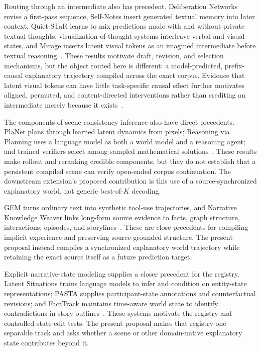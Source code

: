 \documentclass[11pt]{article}
\begin{document}
Routing through an intermediate also has precedent. Deliberation Networks revise a first-pass sequence, Self-Notes insert generated textual memory into later context, Quiet-STaR learns to mix predictions made with and without private textual thoughts, visualization-of-thought systems interleave verbal and visual states, and Mirage inserts latent visual tokens as an imagined intermediate before textual reasoning~\cite{xia2017deliberation,lanchantin2023selfnotes,zelikman2024quietstar,wu2024mindseye,li2025mvot,yang2026mirage}. These results motivate draft, revision, and selection mechanisms, but the object routed here is different: a model-predicted, prefix-causal explanatory trajectory compiled across the exact corpus. Evidence that latent visual tokens can have little task-specific causal effect further motivates aligned, permuted, and content-directed interventions rather than crediting an intermediate merely because it exists~\cite{viveiros2026holdingback}.

The components of scene-consistency inference also have direct precedents. PlaNet plans through learned latent dynamics from pixels; Reasoning via Planning uses a language model as both a world model and a reasoning agent; and trained verifiers select among sampled mathematical solutions~\cite{hafner2019planet,hao2023rap,cobbe2021verifiers}. These results make rollout and reranking credible components, but they do not establish that a persistent compiled scene can verify open-ended corpus continuation. The downstream extension's proposed contribution is this use of a source-synchronized explanatory world, not generic best-of-$K$ decoding.

GEM turns ordinary text into synthetic tool-use trajectories, and Narrative Knowledge Weaver links long-form source evidence to facts, graph structure, interactions, episodes, and storylines~\cite{xu2026gem,tian2026nkw}. These are close precedents for compiling implicit experience and preserving source-grounded structure. The present proposal instead compiles a synchronized explanatory world trajectory while retaining the exact source itself as a future prediction target.

Explicit narrative-state modeling supplies a closer precedent for the registry. Latent Situations trains language models to infer and condition on entity-state representations; PASTA supplies participant-state annotations and counterfactual revisions; and FactTrack maintains time-aware world state to identify contradictions in story outlines~\cite{latentsituations,ghosh2023pasta,facttrack}. These systems motivate the registry and controlled state-edit tests. The present proposal makes that registry one separable track and asks whether a scene or other domain-native explanatory state contributes beyond it.
\end{document}
